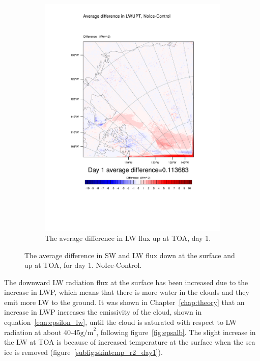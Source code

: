 \begin{figure}
\begin{subfigure}{0.48\textwidth}
		\includegraphics[width=\textwidth]{results/noice/diff_NoIce_LWUPT_Day1.pdf}
		\caption{The average difference in LW flux up at TOA, day 1.}
		\label{subfig:lwup_r2Day1}
	\end{subfigure}
	\caption{The average difference in SW and LW flux down at the surface and up at TOA, for day 1. NoIce-Control.}
	\label{fig:radiation_r2Day1}
\end{figure}

The downward LW radiation flux at the surface has been increased due to the increase in LWP, which means that there is more water in the clouds and they emit more LW to the ground. It was shown in Chapter~\ref{chap:theory} that an increase in LWP increases the emissivity of the cloud, shown in equation~\ref{eqn:epsilon_lw}, until the cloud is saturated with respect to LW radiation at about 40-45$\text{g/m}^2$, following figure~\ref{fig:epsalb}.
The slight increase in the LW at TOA is because of increased temperature at the surface when the sea ice is removed (figure~\ref{subfig:skintemp_r2_day1}).

